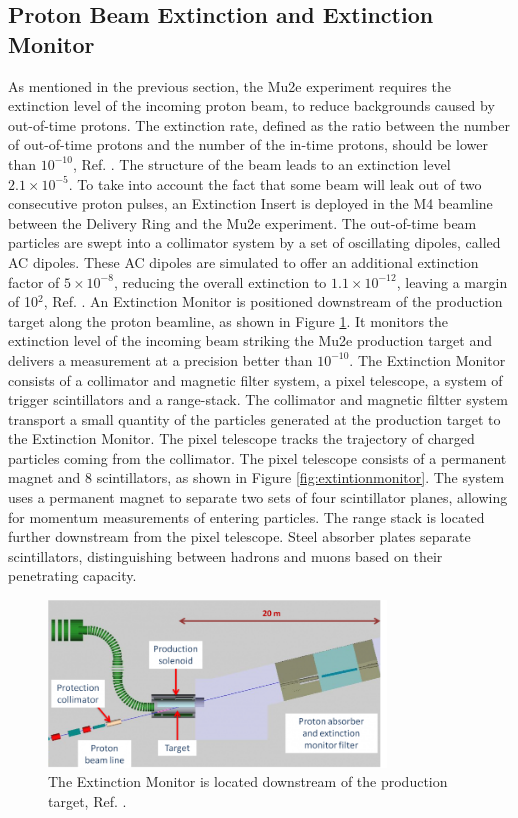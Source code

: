 \subsection{Proton Beam Extinction and Extinction Monitor}
As mentioned in the previous section, the Mu2e experiment requires the extinction level of the incoming proton beam, to reduce backgrounds caused by out-of-time protons. 
The extinction rate, defined as the ratio between the number of out-of-time protons and the number of the in-time protons, should be lower than $10^{-10}$, 
Ref. \cite{bartoszek2015mu2e}. The structure of the beam leads to an extinction level $2.1 \times 10^{-5}$. To take into account the fact that some beam will 
leak out of two consecutive proton pulses, an Extinction Insert is deployed in the M4 beamline between the Delivery Ring and the Mu2e experiment. The out-of-time 
beam particles are swept into a collimator system by a set of oscillating dipoles, called AC dipoles. These AC dipoles are simulated to offer an additional 
extinction factor of $5\times 10^{-8}$, reducing the overall extinction to $1.1 \times 10^{-12}$, leaving a margin of 10$^2$, Ref. \cite{accelerator}. An 
Extinction Monitor is positioned downstream of the production target along the proton beamline, as shown in Figure \ref{fig:extintion}. It monitors the 
extinction level of the incoming beam striking the Mu2e production target and delivers a measurement at a precision better than $10^{-10}$. The Extinction 
Monitor consists of a collimator and magnetic filter system, a pixel telescope, a system of trigger scintillators and a range-stack. The collimator and 
magnetic filtter system transport a small quantity of the particles generated at the production target to the Extinction Monitor. The pixel telescope 
tracks the trajectory of charged particles coming from the collimator. The pixel telescope consists of a permanent magnet and 8 scintillators, as shown 
in Figure \ref{fig:extintionmonitor}. The system uses a permanent magnet to separate two sets of four scintillator planes, allowing for momentum measurements 
of entering particles. The range stack is located further downstream from the pixel telescope. Steel absorber plates separate scintillators, distinguishing 
between hadrons and muons based on their penetrating capacity.
\begin{figure}[!h]
\centering
\includegraphics[width =0.8\textwidth]{figures/png/800px-Extinction_filter.png}
\caption[The Extintion Monitor location.]{The Extinction Monitor is located downstream of the
production target, Ref. \cite{Prebys:IPAC2015-THPF121}.}
\label{fig:extintion}
\end{figure}
